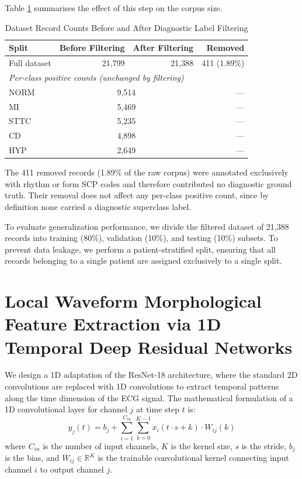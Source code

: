 \documentclass[12pt,a4paper]{report}
\begin{document}
Table \ref{tab:label_filtering} summarises the effect of this step on the corpus size.

\begin{table}[H]
\caption{Dataset Record Counts Before and After Diagnostic Label Filtering}
\label{tab:label_filtering}
\centering
\begin{tabular}{lrrr}
\toprule
\textbf{Split} & \textbf{Before Filtering} & \textbf{After Filtering} & \textbf{Removed} \\
\midrule
Full dataset & 21{,}799 & 21{,}388 & 411 (1.89\%) \\
\midrule
\multicolumn{4}{l}{\textit{Per-class positive counts (unchanged by filtering)}} \\
\quad NORM & \multicolumn{2}{c}{9{,}514} & --- \\
\quad MI & \multicolumn{2}{c}{5{,}469} & --- \\
\quad STTC & \multicolumn{2}{c}{5{,}235} & --- \\
\quad CD & \multicolumn{2}{c}{4{,}898} & --- \\
\quad HYP & \multicolumn{2}{c}{2{,}649} & --- \\
\bottomrule
\end{tabular}
\end{table}

The 411 removed records (1.89\% of the raw corpus) were annotated exclusively with rhythm or form SCP codes and therefore contributed no diagnostic ground truth. Their removal does not affect any per-class positive count, since by definition none carried a diagnostic superclass label.

To evaluate generalization performance, we divide the filtered dataset of 21{,}388 records into training (80\%), validation (10\%), and testing (10\%) subsets. To prevent data leakage, we perform a patient-stratified split, ensuring that all records belonging to a single patient are assigned exclusively to a single split.

\section{Local Waveform Morphological Feature Extraction via 1D Temporal Deep Residual Networks}
We design a 1D adaptation of the ResNet-18 architecture, where the standard 2D convolutions are replaced with 1D convolutions to extract temporal patterns along the time dimension of the ECG signal. The mathematical formulation of a 1D convolutional layer for channel $j$ at time step $t$ is:
\begin{equation}
    y_{j}(t) = b_{j} + \sum_{i=1}^{C_{in}} \sum_{k=0}^{K-1} x_{i}(t \cdot s + k) \cdot W_{ij}(k)
\end{equation}
where $C_{in}$ is the number of input channels, $K$ is the kernel size, $s$ is the stride, $b_{j}$ is the bias, and $W_{ij} \in \mathbb{R}^{K}$ is the trainable convolutional kernel connecting input channel $i$ to output channel $j$.
\end{document}
